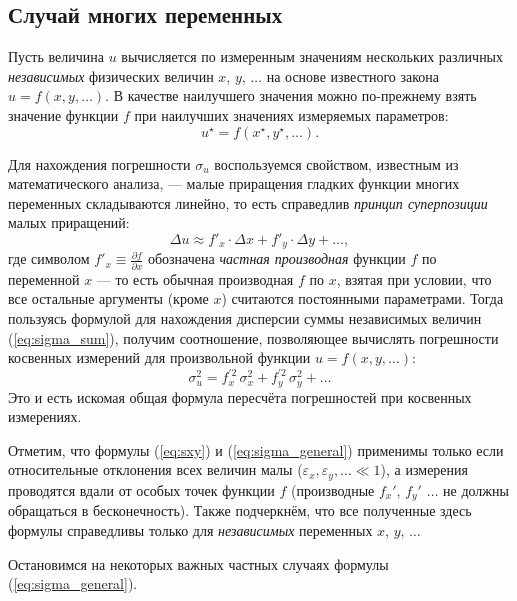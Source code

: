 


\subsection{Случай многих переменных}

Пусть величина $u$ вычисляется по измеренным значениям нескольких
различных \emph{независимых} физических величин $x$, $y$, $\ldots$
на основе известного закона $u=f\!\left(x,y,\ldots\right)$. В качестве
наилучшего значения можно по-прежнему взять значение функции $f$
при наилучших значениях измеряемых параметров:
\[
u^{\star}=f\!\left(x^{\star},y^{\star},\ldots\right).
\]

Для нахождения погрешности $\sigma_{u}$ воспользуемся свойством,
известным из математического анализа, --- малые приращения гладких
функции многих переменных складываются линейно, то есть справедлив
\emph{принцип суперпозиции} малых приращений:
\[
\Delta u\approx f'_{x}\cdot\Delta x+f'_{y}\cdot\Delta y+\ldots,
\]
где символом $f'_{x}\equiv\frac{\partial f}{\partial x}$ обозначена
\emph{частная производная} функции $f$ по переменной $x$ ---
то есть обычная производная $f$ по $x$, взятая при условии, что
все остальные аргументы (кроме $x$) считаются постоянными параметрами.
Тогда пользуясь формулой для нахождения дисперсии суммы независимых
величин (\ref{eq:sigma_sum}), получим соотношение, позволяющее вычислять
погрешности косвенных измерений для произвольной функции
$u=f\left(x,y,\ldots\right)$:
\begin{equation}
\boxed{\sigma_{u}^{2}=f_{x}^{\prime2}\,\sigma_{x}^{2}+f_{y}^{\prime2}\,\sigma_{y
}^{2}+\ldots}\label{eq:sigma_general}
\end{equation}
Это и есть искомая общая формула пересчёта погрешностей при косвенных
измерениях.

Отметим, что формулы (\ref{eq:sxy}) и (\ref{eq:sigma_general}) применимы
только если относительные отклонения всех величин малы
($\varepsilon_{x},\varepsilon_{y},\ldots\ll1$),
а измерения проводятся вдали от особых точек функции $f$ (производные
$f_{x}'$, $f_{y}'$ $\ldots$ не должны обращаться в бесконечность).
Также подчеркнём, что все полученные здесь формулы справедливы только
для \emph{независимых} переменных $x$, $y$, $\ldots$

Остановимся на некоторых важных частных случаях формулы
(\ref{eq:sigma_general}).

